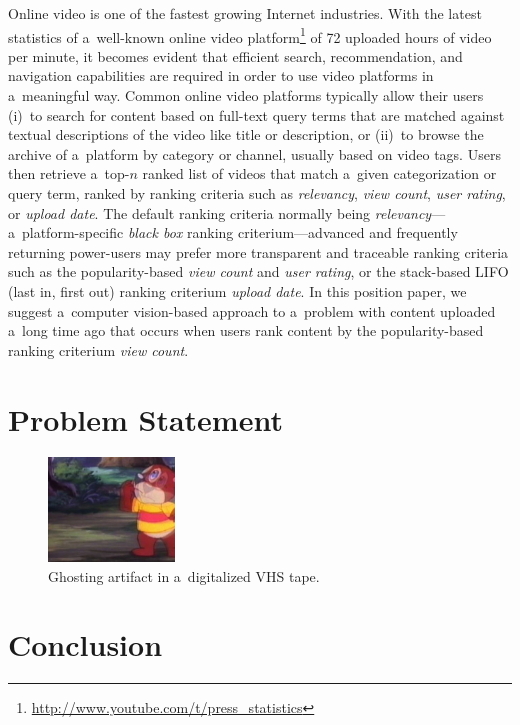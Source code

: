 \documentclass[runningheads,a4paper]{llncs}
\begin{document}
Online video is one of the fastest growing Internet industries.
With the latest statistics of a~well-known online video
platform\footnote{\url{http://www.youtube.com/t/press_statistics}}
of 72 uploaded hours of video per minute,
it becomes evident that efficient search, recommendation, and
navigation capabilities are required in order to use 
video platforms in a~meaningful way. 
Common online video platforms typically allow their users
(i)~to search for content based on full-text query terms
that are matched against textual descriptions
of the video like title or description,
or (ii)~to browse the archive of a~platform by category or channel,
usually based on video tags.
Users then retrieve a~top-$n$ ranked list of videos
that match a~given categorization
or query term, ranked by ranking criteria such as
\emph{relevancy}, \emph{view count},
\emph{user rating}, or \emph{upload date}.
The default ranking criteria normally being
\emph{relevancy}---a~platform-specific \emph{black box}
ranking criterium---advanced and frequently returning power-users
may prefer more transparent and traceable ranking criteria
such as the popularity-based \emph{view count}
and \emph{user rating}, or the stack-based
LIFO (last in, first out) ranking criterium \emph{upload date}.
In this position paper, we suggest a~computer vision-based
approach to a~problem with content uploaded a~long time ago
that occurs when users rank content
by the popularity-based ranking criterium \emph{view count}.

\section{Problem Statement}

\begin{figure}
  \centering
  \includegraphics[width=0.3\textwidth]{ghosting.png} 
  \caption{Ghosting artifact in a~digitalized VHS tape.}
  \label{fig:ghosting}
\end{figure}

\section{Conclusion}


%
\end{document}
